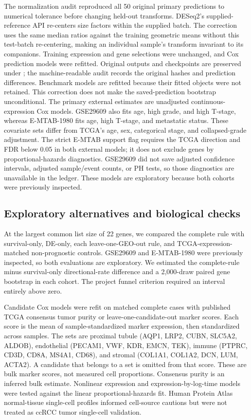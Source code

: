 The normalization audit reproduced all 50 original primary predictions to numerical tolerance before changing held-out transforms. DESeq2's supplied-reference API re-centers size factors within the supplied batch. The correction uses the same median ratios against the training geometric means without this test-batch re-centering, making an individual sample's transform invariant to its companions. Training expression and gene selections were unchanged, and Cox prediction models were refitted. Original outputs and checkpoints are preserved under ; the machine-readable audit records the original hashes and prediction differences. Benchmark models are refitted because their fitted objects were not retained. This correction does not make the saved-prediction bootstrap unconditional.
The primary external estimates are unadjusted continuous-expression Cox models. GSE29609 also fits age, high grade, and high T-stage, whereas E-MTAB-1980 fits age, high T-stage, and metastatic status. These covariate sets differ from TCGA's age, sex, categorical stage, and collapsed-grade adjustment. The strict E-MTAB support flag requires the TCGA direction and FDR below 0.05 in both external models; it does not exclude genes by proportional-hazards diagnostics. GSE29609 did not save adjusted confidence intervals, adjusted sample/event counts, or PH tests, so those diagnostics are unavailable in the ledger. These models are exploratory because both cohorts were previously inspected.

\subsection{Exploratory alternatives and biological checks}
At the largest common list size of 22 genes, we compared the complete rule with survival-only, DE-only, each leave-one-GEO-out rule, and TCGA-expression-matched non-prognostic controls. GSE29609 and E-MTAB-1980 were previously inspected, so both evaluations are exploratory. We estimated the complete-rule minus survival-only directional-rate difference and a 2,000-draw paired gene bootstrap in each cohort. The project funnel criterion required an interval entirely above zero.

Candidate Cox models were refit on matched complete cases with published TCGA consensus tumor purity \cite{aran_purity_2015} or leave-one-candidate-out marker scores. Each score is the mean of sample-standardized marker expression, then standardized across samples. The sets are proximal tubule (AQP1, LRP2, CUBN, SLC5A2, ALDOB), endothelial (PECAM1, VWF, KDR, EMCN, TEK), immune (PTPRC, CD3D, CD8A, MS4A1, CD68), and stromal (COL1A1, COL1A2, DCN, LUM, ACTA2). A candidate that belongs to a set is omitted from that score. These are bulk marker scores, not measured cell proportions. Consensus purity is an inferred bulk estimate. Nonlinear expression and expression-by-log-time models were tested against the linear proportional-hazards fit. Human Protein Atlas normal-tissue single-cell profiles informed cell-source cautions but were not treated as ccRCC tumor single-cell validation.

